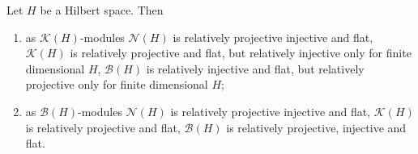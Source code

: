 \begin{proposition}\label{KHAndBHModsRelTh} Let $H$ be a Hilbert space. Then
\begin{enumerate}[label = (\roman*)]
    \item as $\mathcal{K}(H)$-modules $\mathcal{N}(H)$ is relatively projective
    injective and flat, $\mathcal{K}(H)$ is relatively projective and flat, but
    relatively injective only for finite dimensional $H$, $\mathcal{B}(H)$ is
    relatively injective and flat, but relatively projective only for finite
    dimensional $H$;

    \item as $\mathcal{B}(H)$-modules $\mathcal{N}(H)$ is relatively projective
    injective and flat, $\mathcal{K}(H)$ is relatively projective and flat,
    $\mathcal{B}(H)$ is relatively projective, injective and flat.
\end{enumerate}
\end{proposition}
